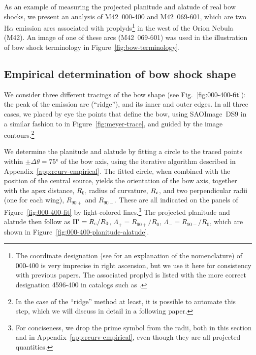 As an example of measuring the projected planitude and alatude of real
bow shocks, we present an analysis of M42~000-400 and M42~069-601,
which are two H\(\alpha\) emission arcs \citep{Bally:2000a,
  Gutierrez-Soto:2015a} associated with proplyds\footnote{%
  The coordinate designation (see \citealp{ODell:1994a} for an
  explanation of the nomenclature) of 000-400 is very imprecise in
  right ascension, but we use it here for consistency with previous
  papers. The associated proplyd is listed with the more correct
  designation 4596-400 in catalogs such as \citet{Ricci:2008a}.  } %
in the west of the Orion Nebula (M42).  An image of one of these arcs
(M42~069-601) was used in the illustration of bow shock terminology in
Figure~\ref{fig:bow-terminology}.


\subsection{Empirical determination of bow shock shape}
\label{sec:empir-determ-bow}

We consider three different tracings of the bow shape (see
Fig.~\ref{fig:000-400-fit}): the peak of the emission arc (``ridge''),
and its inner and outer edges.  In all three cases, we placed by eye
the points that define the bow, using SAOImage~DS9 \citep{Joye:2003a}
in a similar fashion to in Figure~\ref{fig:meyer-trace}, and guided by
the image contours.\footnote{%
  In the case of the ``ridge'' method at least, it is possible to
  automate this step, which we will discuss in detail in a following
  paper. } %

We determine the planitude and alatude by fitting a circle to the
traced points within \(\pm \Delta\theta = \ang{75}\) of the bow axis, using the
iterative algorithm described in Appendix~\ref{app:rcurv-empirical}.
The fitted circle, when combined with the position of the central
source, yields the orientation of the bow axis, together with the apex
distance, \(R_0\), radius of curvature, \(R_{\mathrm{c}}\), and two
perpendicular radii (one for each wing), \(R_{90+}\) and \(R_{90-}\).
These are all indicated on the panels of Figure~\ref{fig:000-400-fit}
by light-colored lines.\footnote{%
  For conciseness, we drop the prime symbol from the radii, both in
  this section and in Appendix~\ref{app:rcurv-empirical}, even though
  they are all projected quantities.} %
The projected planitude and alatude then follow as
\(\Pi' = R_{\mathrm{c}}/R_0\), \(\Lambda_+ = R_{90+}/R_0\),
\(\Lambda_- = R_{90-}/R_0\), which are shown in
Figure~\ref{fig:000-400-planitude-alatude}.

